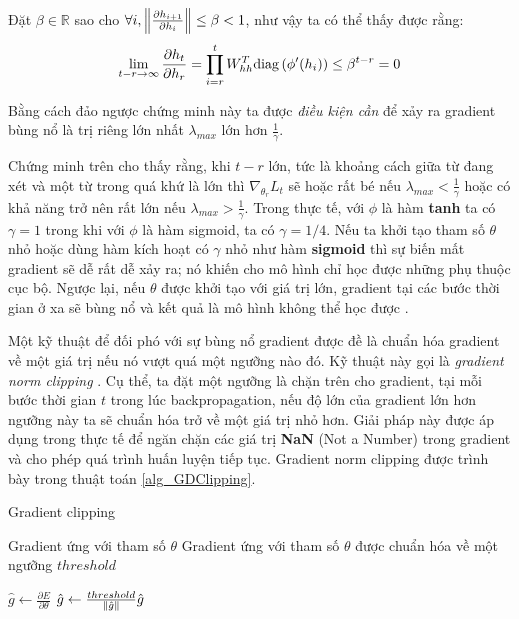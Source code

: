 Đặt $\beta \in \mathbb{R}$ sao cho $\forall i, \left\lVert\frac{\partial h_{i+1}}{\partial h_{i}}\right\rVert \leq \beta < 1$, như vậy ta có thể thấy được rằng:
\begin{equation} \label{gradientVanish6}
	\lim_{t - r \to \infty} \frac{\partial h_{t}}{\partial h_r} = \prod_{i=r}^{t} W_{hh}^T \mathrm{diag} \left(\phi'(h_i) \right) \leq \beta^{t - r} = 0
\end{equation}

Bằng cách đảo ngược chứng minh này ta được \textit{điều kiện cần} để xảy ra gradient bùng nổ là trị riêng lớn nhất $\lambda_{max}$ lớn hơn $\frac{1}{\gamma}$.

Chứng minh trên cho thấy rằng, khi $t-r$ lớn, tức là khoảng cách giữa từ đang xét và một từ trong quá khứ là lớn thì $\nabla_{\theta_r} L_t$ sẽ hoặc rất bé nếu $\lambda_{max} < \frac{1}{\gamma}$ hoặc có khả năng trở nên rất lớn nếu $\lambda_{max} > \frac{1}{\gamma}$. Trong thực tế, với $\phi$ là hàm \textbf{tanh} ta có $\gamma = 1$ trong khi với $\phi$ là hàm sigmoid, ta có $\gamma = 1/4$. Nếu ta khởi tạo tham số $\theta$ nhỏ hoặc dùng hàm kích hoạt có $\gamma$ nhỏ như hàm \textbf{sigmoid} thì sự biến mất gradient sẽ dễ rất dễ xảy ra; nó khiến cho mô hình chỉ học được những phụ thuộc cục bộ. Ngược lại, nếu $\theta$ được khởi tạo với giá trị lớn, gradient tại các bước thời gian ở xa sẽ bùng nổ và kết quả là mô hình không thể học được \cite{pascanu2011}.

Một kỹ thuật để đối phó với sự bùng nổ gradient được đề là chuẩn hóa gradient về một giá trị nếu nó vượt quá một ngưỡng nào đó. Kỹ thuật này gọi là \textit{gradient norm clipping} \cite{pascanu2012}. Cụ thể, ta đặt một ngưỡng là chặn trên cho gradient, tại mỗi bước thời gian $t$ trong lúc backpropagation, nếu độ lớn của gradient lớn hơn ngưỡng này ta sẽ chuẩn hóa trở về một giá trị nhỏ hơn. Giải pháp này được áp dụng trong thực tế để ngăn chặn các giá trị \textbf{NaN} (Not a Number) trong gradient và cho phép quá trình huấn luyện tiếp tục. Gradient norm clipping được trình bày trong thuật toán \ref{alg_GDClipping}.

\begin{algorithm}
	\caption{Gradient clipping}
	\label{alg_GDClipping}
	\begin{algorithmic}[1]
		\renewcommand{\algorithmicrequire}{\textbf{Đầu vào:}}
		\renewcommand{\algorithmicensure}{\textbf{Đầu ra:}}
		\algnewcommand{}
		\algnewcommand\Operation{\item[\algorithmicoperation]}
		
		\Require Gradient ứng với tham số $\theta$
		\Ensure Gradient ứng với tham số $\theta$ được chuẩn hóa về một ngưỡng $threshold$
		
		\Operation
		\State $\hat{g} \leftarrow \frac{\partial E}{\partial \theta}$
			\State $\hat{g} \leftarrow \frac{threshold}{\left\lVert\hat{g}\right\rVert} \hat{g}$
		\EndIf
	\end{algorithmic}
\end{algorithm}

